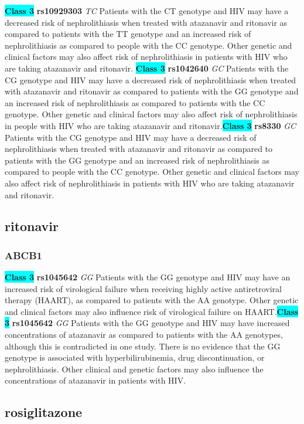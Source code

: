 \documentclass{book}
\begin{document}
\begin{center}
\textbf{\colorbox{cyan} {Class 3}} \textbf{ rs10929303 } \textit{ TC }
Patients with the CT genotype and HIV may have a decreased risk of nephrolithiasis when treated with atazanavir and ritonavir as compared to patients with the TT genotype and an increased risk of nephrolithiasis as compared to people with the CC genotype. Other genetic and clinical factors may also affect risk of nephrolithiasis in patients with HIV who are taking atazanavir and ritonavir. \textbf{\colorbox{cyan} {Class 3}} \textbf{ rs1042640 } \textit{ GC }
Patients with the CG genotype and HIV may have a decreased risk of nephrolithiasis when treated with atazanavir and ritonavir as compared to patients with the GG genotype and an increased risk of nephrolithiasis as compared to patients with the CC genotype. Other genetic and clinical factors may also affect risk of nephrolithiasis in people with HIV who are taking atazanavir and ritonavir.\textbf{\colorbox{cyan} {Class 3}} \textbf{ rs8330 } \textit{ GC }
Patients with the CG genotype and HIV may have a decreased risk of nephrolithiasis when treated with atazanavir and ritonavir as compared to patients with the GG genotype and an increased risk of nephrolithiasis as compared to people with the CC genotype. Other genetic and clinical factors may also affect risk of nephrolithiasis in patients with HIV who are taking atazanavir and ritonavir.


\end{center}\subsection{ ritonavir }


\subsubsection{ ABCB1 }

\begin{center}
\textbf{\colorbox{cyan} {Class 3}} \textbf{ rs1045642 } \textit{ GG }
Patients with the GG genotype and HIV may have an increased risk of virological failure when receiving highly active antiretroviral therapy (HAART), as compared to patients with the AA genotype. Other genetic and clinical factors may also influence risk of virological failure on HAART.\textbf{\colorbox{cyan} {Class 3}} \textbf{ rs1045642 } \textit{ GG }
Patients with the GG genotype and HIV may have increased concentrations of atazanavir as compared to patients with the AA genotypes, although this is contradicted in one study. There is no evidence that the GG genotype is associated with hyperbilirubinemia, drug discontinuation, or nephrolithiasis.  Other clinical and genetic factors may also influence the concentrations of atazanavir in patients with HIV. 


\end{center}\subsection{ rosiglitazone }
\end{document}
